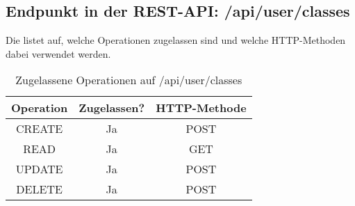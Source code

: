 \subsection{Endpunkt in der REST-API: /api/user/classes}
Die  listet auf, welche Operationen zugelassen sind und welche HTTP-Methoden dabei verwendet werden. 

\begin{table}[!htbp]
	\begin{tabular}{|c|c|c|}
		\hline
			\textbf{Operation} & \textbf{Zugelassen?} & \textbf{HTTP-Methode} \\ \hline
			CREATE & Ja & POST \\ \hline 
			READ & Ja &  GET \\ \hline
			UPDATE & Ja & POST \\ \hline 
			DELETE & Ja & POST \\ \hline
	\end{tabular}

		\caption{Zugelassene Operationen auf /api/user/classes}
		\label{tab:end:rest:api:user:classes:meth}
\end{table}

